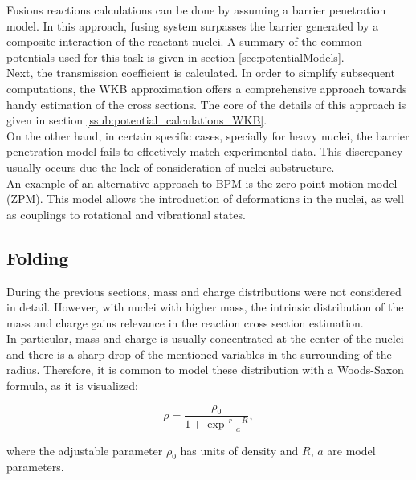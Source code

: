 \documentclass[openany]{book}
\begin{document}
Fusions reactions calculations can be done by assuming a barrier penetration model. In this approach, fusing system surpasses the barrier generated by a composite interaction of the reactant nuclei. A summary of the common potentials used for this task is given in section \ref{sec:potentialModels}. \\

Next, the transmission coefficient is calculated. In order to simplify subsequent computations, the WKB approximation offers a comprehensive approach towards handy estimation of the cross sections. The core of the details of this approach is given in section \ref{ssub:potential_calculations_WKB}. \\

On the other hand, in certain specific cases, specially for heavy nuclei, the barrier penetration model fails to effectively match experimental data. This discrepancy usually occurs due the lack of consideration of nuclei substructure. \\

An example of an alternative approach to BPM is the zero point motion model (ZPM). This model allows the introduction of deformations in the nuclei, as well as couplings to rotational and vibrational states. 


\subsection{Folding} \label{sub:potential_folding}

During the previous sections, mass and charge distributions were not considered in detail. However, with nuclei with higher mass, the intrinsic distribution of the mass and charge gains relevance in the reaction cross section estimation. \\

In particular, mass and charge is usually concentrated at the center of the nuclei and there is a sharp drop of the mentioned variables in the surrounding of the radius. Therefore, it is common to model these distribution with a Woods-Saxon formula, as it is visualized: 

\begin{equation}
	\rho = \frac{\rho_0}{1 + \exp{\frac{r - R}{a}}},
\end{equation}

where the adjustable parameter $\rho_0$ has units of density and $R$, $a$ are model parameters. \\
\end{document}
